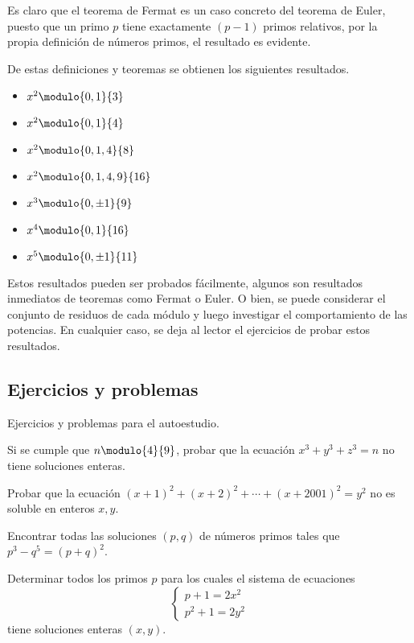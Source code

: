 Es claro que el teorema de Fermat es un caso concreto del teorema de Euler, puesto que un primo $p$ tiene exactamente
$(p - 1)$ primos relativos, por la propia definición de números primos, el resultado es evidente.

De estas definiciones y teoremas se obtienen los siguientes resultados.
\begin{multicols}{2}
    \begin{itemize}
        \item $x^2 \modulo{0,1}{3}$
        \item $x^2 \modulo{0,1}{4}$
        \item $x^2 \modulo{0,1,4}{8}$
        \item $x^2 \modulo{0,1,4,9}{16}$
        \item $x^3 \modulo{0,\pm 1}{9}$
        \item $x^4 \modulo{0,1}{16}$
        \item $x^5 \modulo{0,\pm 1}{11}$
    \end{itemize}
\end{multicols}
Estos resultados pueden ser probados fácilmente, algunos son resultados inmediatos de teoremas como Fermat o Euler.
O bien, se puede considerar el conjunto de residuos de cada módulo y luego investigar el comportamiento de las potencias.
En cualquier caso, se deja al lector el ejercicios de probar estos resultados.

\subsection{Ejercicios y problemas}

Ejercicios y problemas para el autoestudio.

\begin{exercise}
    Si se cumple que $n \modulo{4}{9}$, probar que la ecuación $x^3 + y^3 + z^3 = n$ no tiene soluciones enteras.
\end{exercise}

\begin{exercise}
    Probar que la ecuación $(x + 1)^2 + (x + 2)^2 + \cdots + (x + 2001)^2 = y^2$ no es soluble en enteros $x,y$.
\end{exercise}

\begin{exercise}
    Encontrar todas las soluciones $(p,q)$ de números primos tales que $p^3 - q^5 = (p + q)^2$.
\end{exercise}

\begin{exercise}
    Determinar todos los primos $p$ para los cuales el sistema de ecuaciones
    \[
        \begin{cases}
            p + 1 = 2x^2\\
            p^2 + 1 = 2y^2
        \end{cases}
    \]
    tiene soluciones enteras $(x,y)$.
\end{exercise}

